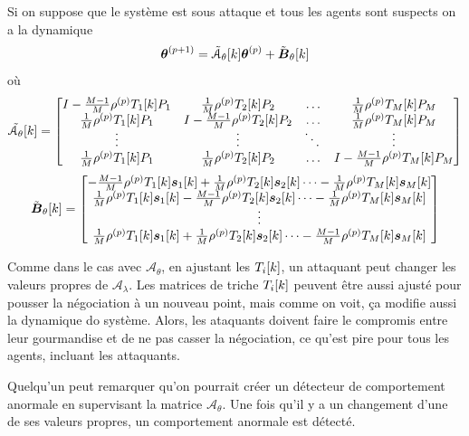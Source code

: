 \documentclass[../main.tex]{subfiles}
\begin{document}
Si on suppose que le système est sous attaque et tous les agents sont suspects on a la dynamique
\begin{equation}
  \label{eq:negotiation_equation_substituting_organizing_tilde_fr}
  \boldsymbol{\theta}^{(p+1)}=\tilde{\mathcal{A}}_{\theta}[k]\boldsymbol{\theta}^{(p)}+\tilde{\mathcal{\boldsymbol{B}}}_{\theta}[k]
\end{equation}
où
\begin{equation}
\tilde{\mathcal{A}_{\theta}}[k]=\left[
\begin{matrix}
I-\frac{M-1}{M}\rho\p \Tik[1]\Plin[1] & \frac{1}{M}\rho\p \Tik[2]\Plin[2]&\dots&\frac{1}{M}\rho\p \Tik[M]\Plin[M]\\
\frac{1}{M}\rho\p \Tik[1]\Plin[1]&I-\frac{M-1}{M}\rho\p \Tik[2]\Plin[2]&\dots&\frac{1}{M}\rho\p \Tik[M]\Plin[M]\\
\vdots&\vdots&\ddots&\vdots\\
\frac{1}{M}\rho\p \Tik[1]\Plin[1]&\frac{1}{M}\rho\p \Tik[2]\Plin[2]&\dots&I-\frac{M-1}{M}\rho\p \Tik[M]\Plin[M]\\
\end{matrix}
\right]
\end{equation}
\begin{equation}
\tilde{\mathcal{\vec{B}}}_{\theta}[k]=\left[
\begin{matrix}
-\frac{M-1}{M}\rho\p \Tik[1]\vec{s}_{1}[k]+\frac{1}{M}\rho\p \Tik[2]\vec{s}_{2}[k]\dots-\frac{1}{M}\rho\p \Tik[M]\vec{s}_{M}[k]\\
\frac{1}{M}\rho\p \Tik[1]\vec{s}_{1}[k]-\frac{M-1}{M}\rho\p \Tik[2]\vec{s}_{2}[k] \dots-\frac{1}{M}\rho\p \Tik[M]\vec{s}_{M}[k]\\
\vdots\\
\frac{1}{M}\rho\p \Tik[1]\vec{s}_{1}[k]+\frac{1}{M}\rho\p \Tik[2]\vec{s}_{2}[k]\dots-\frac{M-1}{M}\rho\p \Tik[M]\vec{s}_{M}[k]\\
\end{matrix}
\right]
\end{equation}

Comme dans le cas avec $\mathcal{A}_{\theta}$, en ajustant les $T_{i}[k]$, un attaquant peut changer les valeurs propres de $\mathcal{A}_{\lambda}$.
Les matrices de triche $T_{i}[k]$ peuvent être aussi ajusté pour pousser la négociation à un nouveau point, mais comme on voit, ça modifie aussi la dynamique do système.
Alors, les ataquants doivent faire le compromis entre leur gourmandise et de ne pas casser la négociation, ce qu'est pire pour tous les agents, incluant les attaquants.

Quelqu'un peut remarquer qu'on pourrait créer un détecteur de comportement anormale en supervisant la matrice $\mathcal{A}_{\theta}$.
Une fois qu'il y a un changement d'une de ses valeurs propres, un comportement anormale est détecté.
\end{document}
